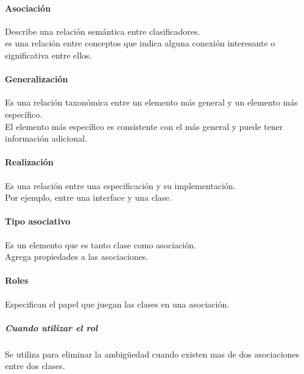 \documentclass[a4paper,12pt,oneside]{report}
\begin{document}
        \paragraph{Asociaci\'on}
          Describe una relaci\'on sem\'antica entre clasificadores.\\
          es una relaci\'on entre conceptos que indica alguna conexi\'on
          interesante o significativa entre ellos.

        \paragraph{Generalizaci\'on}
          Es una relaci\'on taxon\'omica entre un elemento m\'as general y un elemento m\'as
          espec\'ifico.\\
          El elemento m\'as espec\'ifico es consistente con el m\'as general y
          puede tener informaci\'on adicional.

        \paragraph{Realizaci\'on}
          Es una relaci\'on entre una especificaci\'on y su implementaci\'on.\\
          Por ejemplo, entre una interface y una clase.

        \paragraph{Tipo asociativo}
          Es un elemento que es tanto clase como asociaci\'on.\\
          Agrega propiedades a las asociaciones.

        \paragraph{Roles}
          Especifican el papel que juegan las clases en una asociaci\'on.
          \subparagraph{Cuando utilizar el rol}
            Se utiliza para eliminar la ambig\"uedad cuando existen mas de
            dos asociaciones entre dos clases.
\end{document}
